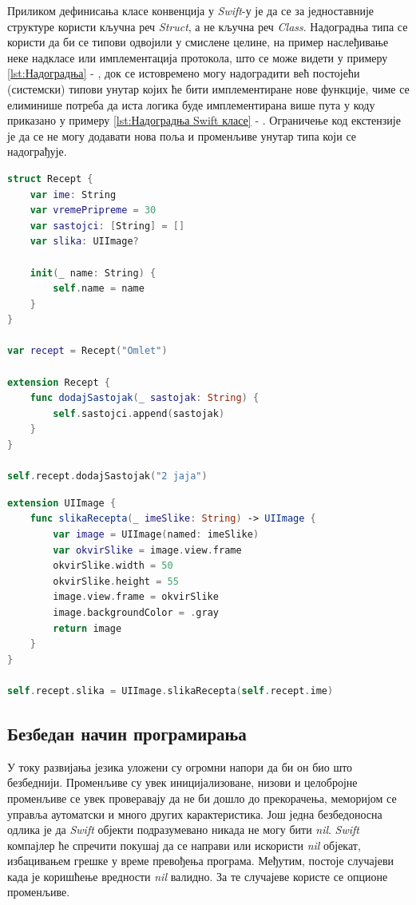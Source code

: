 \documentclass[12pt,oneside]{memoir}
\begin{document}
\indent Приликом дефинисања класе конвенција у \textit{Swift}-у је да се за једноставније структуре користи кључна реч \textit{Struct}, а не кључна реч \textit{Class}. Надоградња типа се користи да би се типови одвојили у смислене целине, на пример наслеђивање неке надкласе или имплементација протокола, што се може видети у примеру \ref{lst:Надоградња} - , док се истовремено могу надоградити већ постојећи (системски) типови унутар којих ће бити имплементиране нове функције, чиме се елиминише потреба да иста логика буде имплементирана више пута у коду приказано у примеру \ref{lst:Надоградња Swift класе} - . Ограничење код екстензије је да се не могу додавати нова поља и променљиве унутар типа који се надограђује.

\begin{lstlisting}[caption=\textit{{Надоградња постојећег типа (класе, структуре)}}, label={lst:Надоградња}, language=Swift, frame=single]
struct Recept {
    var ime: String
    var vremePripreme = 30
    var sastojci: [String] = []
    var slika: UIImage?

    init(_ name: String) {
        self.name = name
    }
}

var recept = Recept("Omlet")

extension Recept {
    func dodajSastojak(_ sastojak: String) {
        self.sastojci.append(sastojak)
    }
}

self.recept.dodajSastojak("2 jaja")
\end{lstlisting}

\begin{lstlisting}[caption=\textit{{Надоградња Swift класе}}, label={lst:Надоградња Swift класе}, language=Swift, frame=single]
extension UIImage {
    func slikaRecepta(_ imeSlike: String) -> UIImage {
        var image = UIImage(named: imeSlike)
        var okvirSlike = image.view.frame
        okvirSlike.width = 50
        okvirSlike.height = 55
        image.view.frame = okvirSlike
        image.backgroundColor = .gray
        return image
    }
}

self.recept.slika = UIImage.slikaRecepta(self.recept.ime)
\end{lstlisting}

\subsection{Безбедан начин програмирања}

\indent У току развијања језика уложени су огромни напори да би он био што безбеднији. Променљиве су увек иницијализоване, низови и целобројне променљиве се увек проверавају да не би дошло до прекорачења, меморијом се управља аутоматски и много других карактеристика.
Још једна безбедоносна одлика је да \textit{Swift} објекти подразумевано никада не могу бити \textit{nil}. \textit{Swift} компајлер ће спречити покушај да се направи или искористи \textit{nil} објекат, избацивањем грешке у време превођења програма.
Међутим, постоје случајеви када је коришћење вредности \textit{nil} валидно. За те случајеве користе се опционе променљиве.
\end{document}
